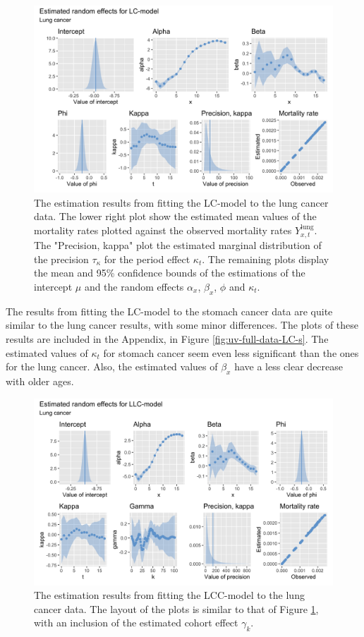 \begin{figure}
    \centering
    \includegraphics[width=0.85\linewidth]{real-data/real-data-univariate/Figures/uv-full-data-lc-l.png}
    \caption{The estimation results from fitting the LC-model to the lung cancer data. The lower right plot show the estimated mean values of the mortality rates plotted against the observed mortality rates $Y_{x,t}^{\text{lung}}$. The "Precision, kappa" plot the estimated marginal distribution of the precision $\tau_\kappa$ for the period effect $\kappa_t$. The remaining plots display the mean and 95\% confidence bounds of the estimations of the intercept $\mu$ and the random effects $\alpha_x$, $\beta_x$, $\phi$ and $\kappa_t$.}
    \label{fig:uv-full-data-LC-l}
\end{figure}

\newpar The results from fitting the LC-model to the stomach cancer data are quite similar to the lung cancer results, with some minor differences. The plots of these results are included in the Appendix, in Figure \ref{fig:uv-full-data-LC-s}. The estimated values of $\kappa_t$ for stomach cancer seem even less significant than the ones for the lung cancer. Also, the estimated values of $\beta_x$ have a less clear decrease with older ages. 

\begin{figure}
    \centering
    \includegraphics[width=0.85\linewidth]{real-data/real-data-univariate/Figures/uv-full-data-lcc-l.png}
    \caption{The estimation results from fitting the LCC-model to the lung cancer data. The layout of the plots is similar to that of Figure \ref{fig:uv-full-data-LC-l}, with an inclusion of the estimated cohort effect $\gamma_k$.}
    \label{fig:uv-full-data-LCC-l}
\end{figure}

